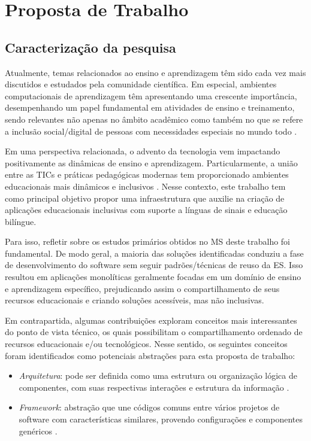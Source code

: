 \chapter{Proposta de Trabalho}
\label{chapter:proposta}

\section{Caracterização da pesquisa}

Atualmente, temas relacionados ao ensino e aprendizagem têm sido cada vez mais discutidos e estudados pela comunidade científica. Em especial, ambientes computacionais de aprendizagem têm apresentando uma crescente importância, desempenhando um papel fundamental em atividades de ensino e treinamento, sendo relevantes não apenas no âmbito acadêmico como também no que se refere a inclusão social/digital de pessoas com necessidades especiais no mundo todo \cite{Svetlana2009,Bersch2017,Cilli2017}.

Em uma perspectiva relacionada, o advento da tecnologia vem impactando positivamente as dinâmicas de ensino e aprendizagem. Particularmente, a união entre as TICs e práticas pedagógicas modernas tem proporcionado ambientes educacionais mais dinâmicos e inclusivos \cite{Cilli2017}. Nesse contexto, este trabalho tem como principal objetivo propor uma infraestrutura que auxilie na criação de aplicações educacionais inclusivas com suporte a línguas de sinais e educação bilíngue.

Para isso, refletir sobre os estudos primários obtidos no MS deste trabalho foi fundamental. De modo geral, a maioria das soluções identificadas conduziu a fase de desenvolvimento do software sem seguir padrões/técnicas de reuso da ES. Isso resultou em aplicações monolíticas geralmente focadas em um domínio de ensino e aprendizagem específico, prejudicando assim o compartilhamento de seus recursos educacionais e criando soluções acessíveis, mas não inclusivas.

Em contrapartida, algumas contribuições exploram conceitos mais interessantes do ponto de vista técnico, os quais possibilitam o compartilhamento ordenado de recursos educacionais e/ou tecnológicos. Nesse sentido, os seguintes conceitos foram identificados como potenciais abstrações para esta proposta de trabalho:

\begin{itemize}
    \item \textit{Arquitetura}: pode ser definida como uma estrutura ou organização lógica de componentes, com suas respectivas interações e estrutura da informação \cite{Pressman2016}. %
    \item \textit{Framework}: abstração que une códigos comuns entre vários projetos de software com características similares, provendo configurações e componentes genéricos \cite{Sommerville2015}.
\end{itemize}

